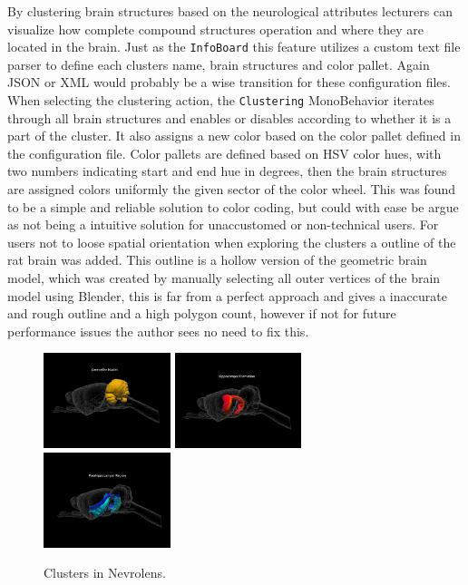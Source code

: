 By clustering brain structures based on the neurological attributes lecturers can visualize how complete compound structures operation and where they are located in the brain. Just as the \texttt{InfoBoard} this feature utilizes a custom text file parser to define each clusters name, brain structures and color pallet. Again JSON or XML would probably be a wise transition for these configuration files. 
When selecting the clustering action, the \texttt{Clustering} MonoBehavior iterates through all brain structures and enables or disables according to whether it is a part of the cluster. It also assigns a new color based on the color pallet defined in the configuration file. Color pallets are defined based on HSV color hues, with two numbers indicating start and end hue in degrees, then the brain structures are assigned colors uniformly the given sector of the color wheel. This was found to be a simple and reliable solution to color coding, but could with ease be argue as not being a intuitive solution for unaccustomed or non-technical users. 
For users not to loose spatial orientation when exploring the clusters a outline of the rat brain was added. This outline is a hollow version of the geometric brain model, which was created by manually selecting all outer vertices of the brain model using Blender, this is far from a perfect approach and gives a inaccurate and rough outline and a high polygon count, however if not for future performance issues the author sees no need to fix this.


\begin{figure}[ht]
    \includegraphics[width=0.33\textwidth]{fig/cluster1.png}
    \includegraphics[width=0.33\textwidth]{fig/cluster2.png}
    \includegraphics[width=0.33\textwidth]{fig/cluster3.png}
    \caption{Clusters in Nevrolens.}
    \label{fig:clustering}
\end{figure}



